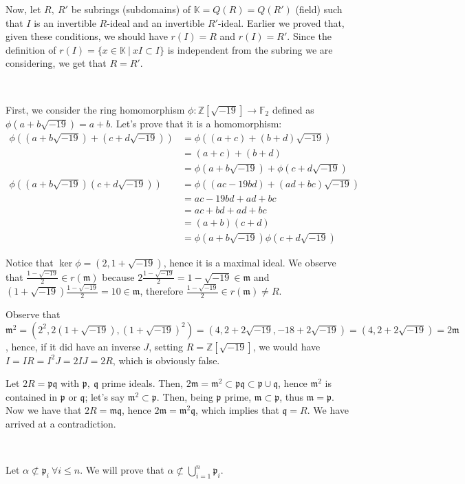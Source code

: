 \documentclass{article}
\newcommand{\numberset}{\mathbb}
\newcommand{\Z}{\numberset{Z}}
\newcommand{\K}{\numberset{K}}
\newcommand{\F}{\numberset{F}}
\newcommand{\pid}{\mathfrak{p}}
\newcommand{\qid}{\mathfrak{q}}
\newcommand{\mi}{\mathfrak{m}}
\newcommand{\exercise}[1]{\noindent {\bf Exercise #1}}
\begin{document}
Now, let $R,\ R'$ be subrings (subdomains) of $\K=Q(R)=Q(R')$ (field) such that $I$ is an invertible $R$-ideal and an invertible $R'$-ideal. Earlier we proved that, given these conditions, we should have $r(I)=R$ and $r(I)=R'$. Since the definition of $r(I)=\{x\in\K\ |\ xI\subset I\}$ is independent from the subring we are considering, we get that $R=R'$.


~\\
\exercise{13}

First, we consider the ring homomorphism $\phi:\Z[\sqrt{-19}]\rightarrow\F_2$ defined as $\phi(a+b\sqrt{-19})=a+b$. Let's prove that it is a homomorphism:
\begin{align*}
		\phi((a+b\sqrt{-19})+(c+d\sqrt{-19})) & = \phi((a+c)+(b+d)\sqrt{-19}) \\
		& = (a+c)+(b+d) \\
		& =\phi(a+b\sqrt{-19})+\phi(c+d\sqrt{-19}) \\
		\phi((a+b\sqrt{-19})(c+d\sqrt{-19})) & =\phi((ac-19bd)+(ad+bc)\sqrt{-19}) \\
		& = ac-19bd+ad+bc \\
		& = ac+bd+ad+bc \\
		& =(a+b)(c+d) \\
		& =\phi(a+b\sqrt{-19})\phi(c+d\sqrt{-19})
\end{align*}

Notice that $\ker\phi=(2,1+\sqrt{-19})$, hence it is a maximal ideal. We observe that $\frac{1-\sqrt{-19}}{2}\in r(\mi)$ because $2\frac{1-\sqrt{-19}}{2}=1-\sqrt{-19}\in\mi$ and $(1+\sqrt{-19})\frac{1-\sqrt{-19}}{2}=10\in\mi$, therefore $\frac{1-\sqrt{-19}}{2}\in r(\mi)\neq R$.

Observe that $\mi^2=(2^2,2(1+\sqrt{-19}),(1+\sqrt{-19})^2)=(4,2+2\sqrt{-19},-18+2\sqrt{-19})=(4,2+2\sqrt{-19})=2\mi$, hence, if it did have an inverse $J$, setting $R=\Z[\sqrt{-19}]$, we would have $I=IR=I^2J=2IJ=2R$, which is obviously false.

Let $2R=\pid\qid$ with $\pid,\ \qid$ prime ideals. Then, $2\mi=\mi^2\subset\pid\qid\subset\pid\cup\qid$, hence $\mi^2$ is contained in $\pid$ or $\qid$; let's say $\mi^2\subset\pid$. Then, being $\pid$ prime, $\mi\subset\pid$, thus $\mi=\pid$. Now we have that $2R=\mi\qid$, hence $2\mi=\mi^2\qid$, which implies that $\qid=R$. We have arrived at a contradiction.


~\\
\exercise{24}

Let $\alpha\not\subset\pid_i\ \forall i\leq n$. We will prove that $\alpha\not\subset\bigcup_{i=1}^n\pid_i$.
\end{document}
